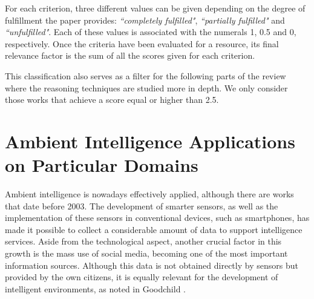 For each criterion, three different values can be given depending on the degree of fulfillment the paper provides: \textit{``completely fulfilled"}, \textit{``partially fulfilled"} and \textit{``unfulfilled"}. Each of these values is associated with the numerals 1, 0.5 and 0, respectively. Once the criteria have been evaluated for a resource, its final relevance factor is the sum of all the scores given for each criterion.






This classification also serves as a filter for the following parts of the review where the reasoning techniques are studied more in depth. We only consider those works that achieve a score equal or higher than 2.5.


\section{Ambient Intelligence Applications on Particular Domains\label{sec:usage}}
Ambient intelligence is nowadays effectively applied, although there are works that date before 2003. The development of smarter sensors, as well as the implementation of these sensors in conventional devices, such as smartphones, has made it possible to collect a considerable amount of data to support intelligence services. Aside from the technological aspect, another crucial factor in this growth is the mass use of social media, becoming one of the most important information sources. Although this data is not obtained directly by sensors but provided by the own citizens, it is equally relevant for the development of intelligent environments, as noted in Goodchild \citep{goodchild2007citizens}. 

